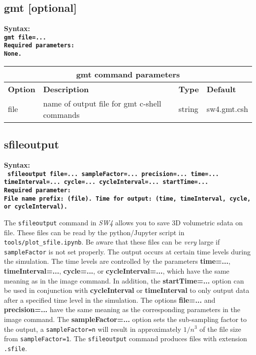 \documentclass[11pt]{report}
\begin{document}
\subsection{gmt [optional]}
\label{keyword:gmt}
\begin{flushleft}\bf
Syntax:\\
\tt gmt file=...\\
\bf Required parameters:\\
\rm None.
\end{flushleft}
%
\begin{center}
\begin{tabular}{|l|p{8cm}|l|l|} \hline
\multicolumn{4}{|c|}{\bf gmt command parameters}\\ \hline
\bf{Option} & \bf{Description} & \bf{Type} & \bf{Default} \\ \hline \hline
file & name of output file for gmt c-shell commands & string & sw4.gmt.csh  \\ \hline
\end{tabular}
\end{center}


\subsection{sfileoutput}
\label{keyword:sfileoutput}

\begin{flushleft}
\bf Syntax:\\ \tt 
sfileoutput file=... sampleFactor=... precision=... 
         time=... timeInterval=... cycle=... cycleInterval=... startTime=... \\
\bf Required parameter:\\
\rm File name prefix: (file).
\rm Time for output: (time, timeInterval, cycle, or cycleInterval).
\end{flushleft}
%
The \verb+sfileoutput+ command in \emph{SW4} allows you to save 3D volumetric sdata on file. These files
can be read by the python/Jupyter script in \verb+tools/plot_sfile.ipynb+. 
Be aware that these files can be {\em very} large if \verb+sampleFactor+ is not set properly. 
The output occurs at certain time levels during the simulation. The time levels are
controlled by the parameters {\bf time=...}, {\bf timeInterval=...}, {\bf cycle=...}, or {\bf
  cycleInterval=...}, which have the same meaning as in the image command. In addition, the {\bf
  startTime=...} option can be used in conjunction with {\bf cycleInterval} or {\bf timeInterval} to
only output data after a specified time level in the simulation. The options {\bf file=...} 
and {\bf precision=...} have the same meaning as the corresponding parameters in the
image command. The {\bf sampleFactor=...} option sets the sub-sampling factor to the output, a 
\verb+sampleFactor=n+ will result in approximately $1/n^3$ of the file size from \verb+sampleFactor=1+.
The \verb+sfileoutput+ command produces files with extension \verb+.sfile+.
\end{document}
